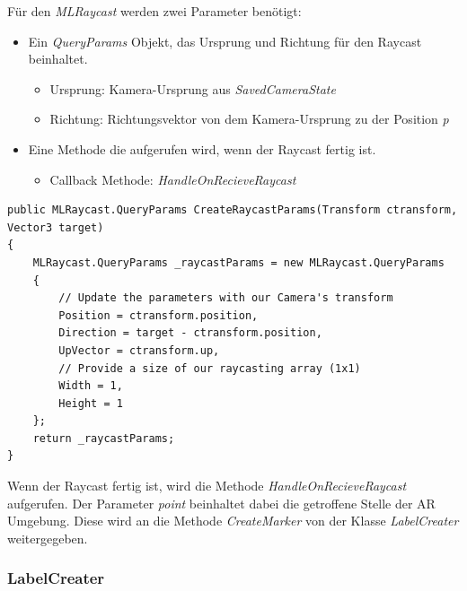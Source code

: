 Für den \textit{MLRaycast} werden zwei Parameter benötigt:
\begin{itemize}
	\item Ein \textit{QueryParams} Objekt, das Ursprung und Richtung für den Raycast beinhaltet.
	\begin{itemize}
		\item Ursprung: Kamera-Ursprung aus \textit{SavedCameraState}
		\item Richtung: Richtungsvektor von dem Kamera-Ursprung zu der Position \textit{p}
	\end{itemize}
	\item Eine Methode die aufgerufen wird, wenn der Raycast fertig ist. 
	\begin{itemize}
		\item Callback Methode: \textit{HandleOnRecieveRaycast}
	\end{itemize}
\end{itemize}



\begin{lstlisting}
public MLRaycast.QueryParams CreateRaycastParams(Transform ctransform, Vector3 target)
{
	MLRaycast.QueryParams _raycastParams = new MLRaycast.QueryParams
	{
		// Update the parameters with our Camera's transform
		Position = ctransform.position,
		Direction = target - ctransform.position,
		UpVector = ctransform.up,
		// Provide a size of our raycasting array (1x1)
		Width = 1,
		Height = 1
	};
	return _raycastParams;
}
\end{lstlisting}

Wenn der Raycast fertig ist, wird die Methode \textit{HandleOnRecieveRaycast} aufgerufen. Der Parameter \textit{point} beinhaltet dabei die getroffene Stelle der AR Umgebung.
Diese wird an die Methode \textit{CreateMarker} von der Klasse \textit{LabelCreater} weitergegeben.

\subsubsection{LabelCreater}


